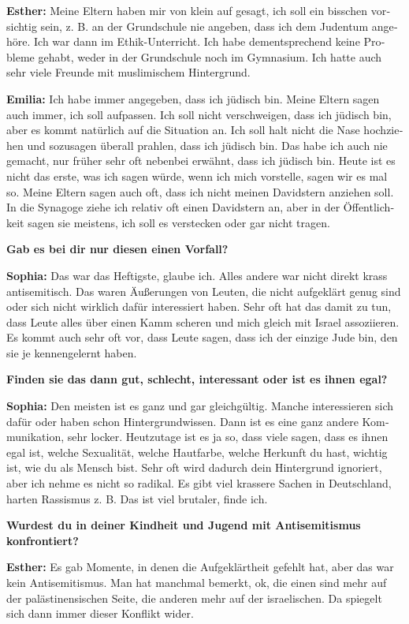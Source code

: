 \begin{otherlanguage}{ngerman}
\textbf{Esther:} Meine Eltern haben mir von klein auf gesagt, ich soll ein bisschen vorsichtig sein, z. B. an der Grundschule nie angeben, dass ich dem Judentum angehöre. Ich war dann im Ethik-Unterricht. Ich habe dementsprechend keine Probleme gehabt, weder in der Grundschule noch im Gymnasium. Ich hatte auch sehr viele Freunde mit muslimischem Hintergrund. 

\textbf{Emilia:} Ich habe immer angegeben, dass ich jüdisch bin. Meine Eltern sagen auch immer, ich soll aufpassen. Ich soll nicht verschweigen, dass ich jüdisch bin, aber es kommt natürlich auf die Situation an. Ich soll halt nicht die Nase hochziehen und sozusagen überall prahlen, dass ich jüdisch bin. Das habe ich auch nie gemacht, nur früher sehr oft nebenbei erwähnt, dass ich jüdisch bin. Heute ist es nicht das erste, was ich sagen würde, wenn ich mich vorstelle, sagen wir es mal so. Meine Eltern sagen auch oft, dass ich nicht meinen Davidstern anziehen soll. In die Synagoge ziehe ich relativ oft einen Davidstern an, aber in der Öffentlichkeit sagen sie meistens, ich soll es verstecken oder gar nicht tragen.  

\textbf{Gab es bei dir nur diesen einen Vorfall?} 

\textbf{Sophia:} Das war das Heftigste, glaube ich. Alles andere war nicht direkt krass antisemitisch. Das waren Äußerungen von Leuten, die nicht aufgeklärt genug sind oder sich nicht wirklich dafür interessiert haben. Sehr oft hat das damit zu tun, dass Leute alles über einen Kamm scheren und mich gleich mit Israel assoziieren. Es kommt auch sehr oft vor, dass Leute sagen, dass ich der einzige Jude bin, den sie je kennengelernt haben. 

\textbf{Finden sie das dann gut, schlecht, interessant oder ist es ihnen egal?} 

\textbf{Sophia:} Den meisten ist es ganz und gar gleichgültig. Manche interessieren sich dafür oder haben schon Hintergrundwissen. Dann ist es eine ganz andere Kommunikation, sehr locker. Heutzutage ist es ja so, dass viele sagen, dass es ihnen egal ist, welche Sexualität, welche Hautfarbe, welche Herkunft du hast, wichtig ist, wie du als Mensch bist. Sehr oft wird dadurch dein Hintergrund ignoriert, aber ich nehme es nicht so radikal. Es gibt viel krassere Sachen in Deutschland, harten Rassismus z. B. Das ist viel brutaler, finde ich.  

\textbf{Wurdest du in deiner Kindheit und Jugend mit Antisemitismus konfrontiert?} 

\textbf{Esther:} Es gab Momente, in denen die Aufgeklärtheit gefehlt hat, aber das war kein Antisemitismus. Man hat manchmal bemerkt, ok, die einen sind mehr auf der palästinensischen Seite, die anderen mehr auf der israelischen. Da spiegelt sich dann immer dieser Konflikt wider.  


\end{otherlanguage}
